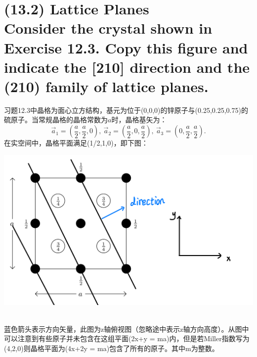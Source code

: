 \documentclass[reqno,a4paper,12pt]{amsart}
\begin{document}
\section{\textbf{(13.2) Lattice Planes} \\
Consider the crystal shown in Exercise 12.3. Copy this figure and indicate the [210] direction and the (210) family of lattice planes.
}
\begin{tcolorbox}[breakable, colback = black!5!white, colframe = black]
习题12.3中晶格为面心立方结构，基元为位于(0,0,0)的锌原子与(0.25,0.25,0.75)的硫原子。当常规晶格的晶格常数为$a$时，晶格基矢为：
\[
	\vec{a}_1 = \left( \frac{a}{2}, \frac{a}{2}, 0 \right), ~ \vec{a}_2 = \left( \frac{a}{2}, 0, \frac{a}{2} \right), ~ \vec{a}_3 = \left( 0, \frac{a}{2}, \frac{a}{2} \right).
\]
在实空间中，晶格平面满足(1/2,1,0)，即下图：\\
\begin{centering}
	\includegraphics[scale = 0.2]{13.2.jpeg}
\end{centering} \\
蓝色箭头表示方向矢量，此图为z轴俯视图（忽略途中表示z轴方向高度）。从图中可以注意到有些原子并未包含在这组平面(2x+y = ma)内，但是若Miller指数写为(4,2,0)则晶格平面为(4x+2y = ma)包含了所有的原子。其中m为整数。
\end{tcolorbox}
\end{document}
